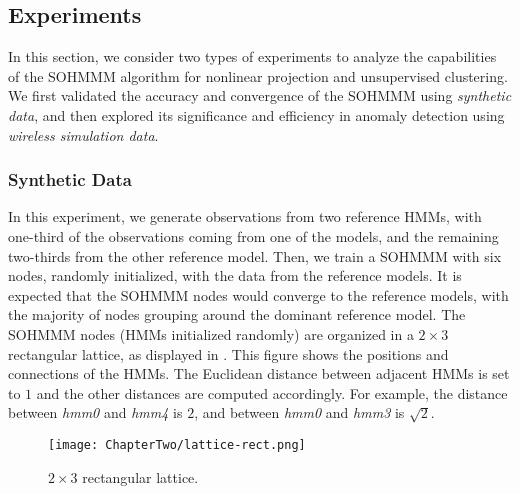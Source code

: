 \subsection{Experiments}
\label{sec:sohmmm_experiments}
In this section, we consider two types of experiments to analyze the capabilities of the SOHMMM algorithm for nonlinear projection and unsupervised clustering. We first validated the accuracy and convergence of the SOHMMM using \textit{synthetic data}, and then explored its significance and efficiency in anomaly detection using \textit{wireless simulation data}.

\subsubsection{Synthetic Data}
\label{sec:sohmmm_experiment_synth}

In this experiment, we generate observations from two reference HMMs, with one-third of the observations coming from one of the models, and the remaining two-thirds from the other reference model. Then, we train a SOHMMM with six nodes, randomly initialized, with the data from the reference models. It is expected that the SOHMMM nodes would converge to the reference models, with the majority of nodes grouping around the dominant reference model. The SOHMMM nodes (HMMs initialized randomly) are organized in a $2 \times 3$ rectangular lattice, as displayed in . This figure shows the positions and connections of the HMMs. The Euclidean distance between adjacent HMMs is set to $1$ and the other distances are computed accordingly. For example, the distance between \textit{hmm0} and \textit{hmm4} is $2$, and between \textit{hmm0} and \textit{hmm3} is $\sqrt{2}$.

\begin{figure}[h]
	\centering
	\texttt{[image: ChapterTwo/lattice-rect.png]}
	\caption{$2 \times 3$ rectangular lattice.}
	\label{fig:sohmmm_lattice}      
\end{figure}

